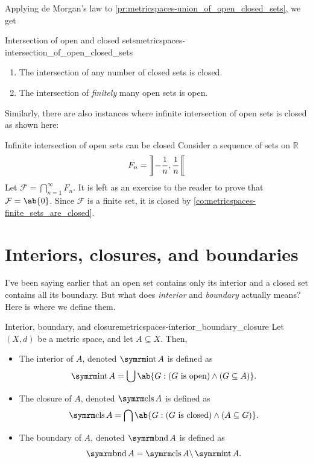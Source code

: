 Applying de Morgan's law to \cref{pr:metricspaces-union_of_open_closed_sets}, we get
\begin{prop}{Intersection of open and closed sets}{metricspaces-intersection_of_open_closed_sets}
  \begin{enumerate}[noitemsep]
    \item The intersection of any number of closed sets is closed.
    \item The intersection of \emph{finitely} many open sets is open.
  \end{enumerate}
\end{prop}
Similarly, there are also instances where infinite intersection of open sets is closed
as shown here:
\begin{exmp}{Infinite intersection of open sets can be closed}{}
  Consider a sequence of sets on \(\mathbb{R}\)
  \begin{equation}
    F_n = \ointv{-\frac{1}{n}, \frac{1}{n}}
  \end{equation}
  Let \(\mathcal{F} = \bigcap_{n=1}^{\infty} F_n\). It is left as an exercise to the
  reader to prove that \(\mathcal{F} = \ab\{0\}\). Since \(\mathcal{F}\) is a finite
  set, it is closed by \cref{co:metricspaces-finite_sets_are_closed}.
\end{exmp}

\section{Interiors, closures, and boundaries}

I've been saying earlier that an open set contains only its interior and a closed set
contains all its boundary. But what does \emph{interior} and \emph{boundary} actually means?
Here is where we define them.

\begin{df}{Interior, boundary, and closure}{metricspaces-interior_boundary_closure}
  Let \((X, d)\) be a metric space, and let \(A \subseteq X\). Then,
  \begin{itemize}[noitemsep]
    \item The interior of \(A\), denoted \(\intr A\) is defined as
          \[
            \intr A = \bigcup \ab\{G : (G \textrm{ is open}) \land (G \subseteq A)\}.
          \]
    \item The closure of \(A\), denoted \(\clos A\) is defined as
          \[
            \clos A = \bigcap \ab\{G : (G \textrm{ is closed}) \land (A \subseteq G)\}.
          \]
    \item The boundary of \(A\), denoted \(\bnd A\) is defined as
          \[
            \bnd A = \clos A \smin \intr A.
          \]
  \end{itemize}
\end{df}

